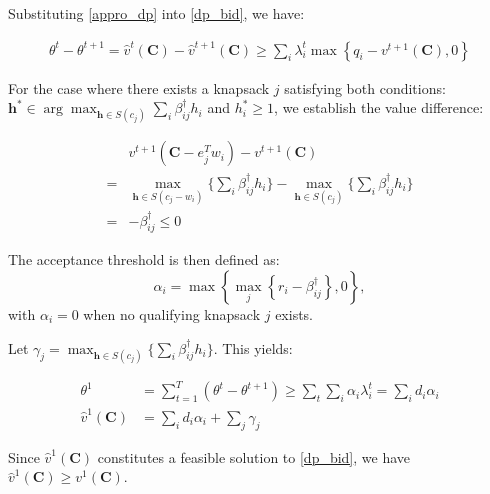 


Substituting \eqref{appro_dp} into \eqref{dp_bid}, we have:

\begin{align}
    \theta^{t} - \theta^{t+1} = \hat{v}^{t}(\bm{C}) - \hat{v}^{t+1}(\bm{C}) \geq \sum_{i} \lambda_{i}^{t} \max\left\{q_{i} - v^{t+1}(\bm{C}), 0\right\}
\end{align}

For the case where there exists a knapsack $j$ satisfying both conditions: $\bm{h}^{*} \in \arg\max_{\bm{h} \in S(c_j)} \sum_{i} \beta_{ij}^{\dag} h_{i}$ and $h_{i}^{*} \geq 1$, we establish the value difference: 

\begin{align*}
    & v^{t+1}(\bm{C} - e_{j}^{T} w_{i}) - v^{t+1}(\bm{C}) \\ 
  = & \max_{\bm{h} \in S(c_{j}- w_{i})} \{\sum_{i} \beta_{ij}^{\dag} h_{i}\} - \max_{\bm{h} \in S(c_{j})} \{\sum_{i} \beta_{ij}^{\dag} h_{i}\} \\
  = & -\beta_{ij}^{\dag} \leq 0
\end{align*}

The acceptance threshold is then defined as:
$$\alpha_{i} = \max\left\{\max_{j}\left\{r_i - \beta_{ij}^{\dag} \right\}, 0\right\},$$ 
with $\alpha_{i} = 0$ when no qualifying knapsack $j$ exists.

Let $\gamma_{j} = \max_{\bm{h} \in S(c_{j})} \{\sum_{i} \beta_{ij}^{\dag} h_{i}\}$. This yields:

\begin{align*}
    \theta^{1} & = \sum_{t=1}^{T} (\theta^{t} - \theta^{t+1}) \geq \sum_{t} \sum_{i} \alpha_{i} \lambda_{i}^{t} = \sum_{i} d_{i} \alpha_{i} \\
    \hat{v}^{1}(\bm{C}) & = \sum_{i} d_{i} \alpha_{i} + \sum_{j} \gamma_{j}
\end{align*}

Since $\hat{v}^{1}(\bm{C})$ constitutes a feasible solution to \eqref{dp_bid}, we have $\hat{v}^{1}(\bm{C}) \geq v^{1}(\bm{C})$.

